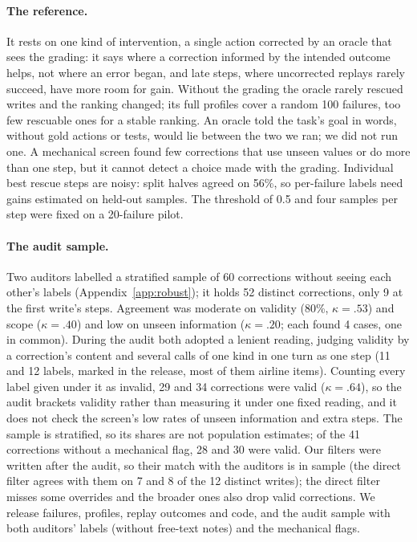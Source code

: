 \documentclass[11pt]{article}
\begin{document}
\paragraph{The reference.} It rests on one kind of intervention, a single action corrected by an oracle that sees the grading: it says where a correction informed by the intended outcome helps, not where an error began, and late steps, where uncorrected replays rarely succeed, have more room for gain. Without the grading the oracle rarely rescued writes and the ranking changed; its full profiles cover a random 100 failures, too few rescuable ones for a stable ranking. An oracle told the task's goal in words, without gold actions or tests, would lie between the two we ran; we did not run one. A mechanical screen found few corrections that use unseen values or do more than one step, but it cannot detect a choice made with the grading. Individual best rescue steps are noisy: split halves agreed on 56\%, so per-failure labels need gains estimated on held-out samples. The threshold of 0.5 and four samples per step were fixed on a 20-failure pilot.

\paragraph{The audit sample.} Two auditors labelled a stratified sample of 60 corrections without seeing each other's labels (Appendix~\ref{app:robust}); it holds 52 distinct corrections, only 9 at the first write's steps. Agreement was moderate on validity (80\%, $\kappa=.53$) and scope ($\kappa=.40$) and low on unseen information ($\kappa=.20$; each found 4 cases, one in common). During the audit both adopted a lenient reading, judging validity by a correction's content and several calls of one kind in one turn as one step (11 and 12 labels, marked in the release, most of them airline items). Counting every label given under it as invalid, 29 and 34 corrections were valid ($\kappa=.64$), so the audit brackets validity rather than measuring it under one fixed reading, and it does not check the screen's low rates of unseen information and extra steps. The sample is stratified, so its shares are not population estimates; of the 41 corrections without a mechanical flag, 28 and 30 were valid. Our filters were written after the audit, so their match with the auditors is in sample (the direct filter agrees with them on 7 and 8 of the 12 distinct writes); the direct filter misses some overrides and the broader ones also drop valid corrections. We release failures, profiles, replay outcomes and code, and the audit sample with both auditors' labels (without free-text notes) and the mechanical flags.
\end{document}
